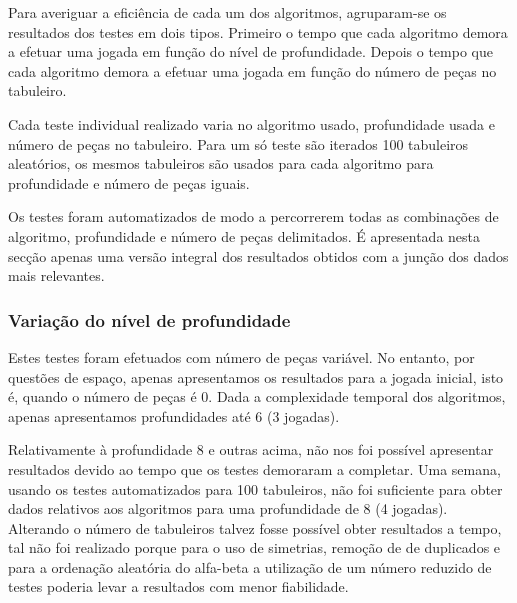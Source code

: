 Para averiguar a eficiência de cada um dos algoritmos, agruparam-se os resultados dos testes em dois tipos. Primeiro o tempo que cada algoritmo demora a efetuar uma jogada em função do nível de profundidade. Depois o tempo que cada algoritmo demora a efetuar uma jogada em função do número de peças no tabuleiro. 

Cada teste individual realizado varia no algoritmo usado, profundidade usada e número de peças no tabuleiro. Para um só teste são iterados 100 tabuleiros aleatórios, os mesmos tabuleiros são usados para cada algoritmo para profundidade e número de peças iguais.

Os testes foram automatizados de modo a percorrerem todas as combinações de algoritmo, profundidade e número de peças delimitados. É apresentada nesta secç\~ao apenas uma versão integral dos resultados obtidos com a junção dos dados mais relevantes.

\subsubsection{Variação do nível de profundidade}

Estes testes foram efetuados com número de peças variável. No entanto, por questões de espaço, apenas apresentamos os resultados para a jogada inicial, isto é, quando o número de peças é 0. Dada a complexidade temporal dos algoritmos, apenas apresentamos profundidades até 6 (3 jogadas).

Relativamente à profundidade 8 e outras acima, n\~ao nos foi possível apresentar resultados devido ao tempo que os testes demoraram a completar. Uma semana, usando os testes automatizados para 100 tabuleiros, não foi suficiente para obter dados relativos aos algoritmos para uma profundidade de 8 (4 jogadas). Alterando o número de tabuleiros talvez fosse possível obter resultados a tempo, tal n\~ao foi realizado porque para o uso de simetrias, remoção de de duplicados e para a ordenação aleatória do alfa-beta a utilização de um número reduzido de testes poderia levar a resultados com menor fiabilidade.

